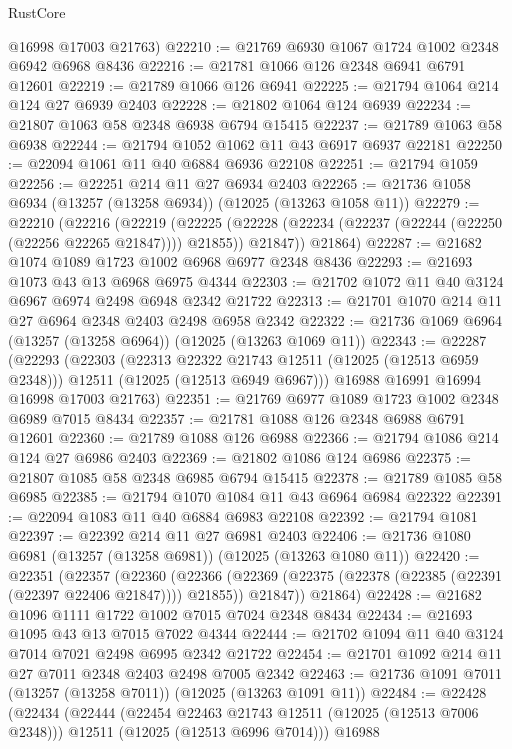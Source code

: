 \begin{lexlean}{RustCore}
\begin{coremodule}
      @16998
      @17003
      @21763)
@22210 := @21769 @6930 @1067 @1724 @1002 @2348 @6942 @6968 @8436
@22216 := @21781 @1066 @126 @2348 @6941 @6791 @12601
@22219 := @21789 @1066 @126 @6941
@22225 := @21794 @1064 @214 @124 @27 @6939 @2403
@22228 := @21802 @1064 @124 @6939
@22234 := @21807 @1063 @58 @2348 @6938 @6794 @15415
@22237 := @21789 @1063 @58 @6938
@22244 := @21794 @1052 @1062 @11 @43 @6917 @6937 @22181
@22250 := @22094 @1061 @11 @40 @6884 @6936 @22108
@22251 := @21794 @1059
@22256 := @22251 @214 @11 @27 @6934 @2403
@22265 := @21736 @1058 @6934 (@13257 (@13258 @6934)) (@12025 (@13263 @1058 @11))
@22279 := @22210
    (@22216
      (@22219
        (@22225 (@22228 (@22234 (@22237 (@22244 (@22250 (@22256 @22265 @21847)))) @21855)) @21847))
      @21864)
@22287 := @21682 @1074 @1089 @1723 @1002 @6968 @6977 @2348 @8436
@22293 := @21693 @1073 @43 @13 @6968 @6975 @4344
@22303 := @21702 @1072 @11 @40 @3124 @6967 @6974 @2498 @6948 @2342 @21722
@22313 := @21701 @1070 @214 @11 @27 @6964 @2348 @2403 @2498 @6958 @2342
@22322 := @21736 @1069 @6964 (@13257 (@13258 @6964)) (@12025 (@13263 @1069 @11))
@22343 := @22287
    (@22293
      (@22303
        (@22313 @22322 @21743 @12511 (@12025 (@12513 @6959 @2348)))
        @12511
        (@12025 (@12513 @6949 @6967)))
      @16988
      @16991
      @16994
      @16998
      @17003
      @21763)
@22351 := @21769 @6977 @1089 @1723 @1002 @2348 @6989 @7015 @8434
@22357 := @21781 @1088 @126 @2348 @6988 @6791 @12601
@22360 := @21789 @1088 @126 @6988
@22366 := @21794 @1086 @214 @124 @27 @6986 @2403
@22369 := @21802 @1086 @124 @6986
@22375 := @21807 @1085 @58 @2348 @6985 @6794 @15415
@22378 := @21789 @1085 @58 @6985
@22385 := @21794 @1070 @1084 @11 @43 @6964 @6984 @22322
@22391 := @22094 @1083 @11 @40 @6884 @6983 @22108
@22392 := @21794 @1081
@22397 := @22392 @214 @11 @27 @6981 @2403
@22406 := @21736 @1080 @6981 (@13257 (@13258 @6981)) (@12025 (@13263 @1080 @11))
@22420 := @22351
    (@22357
      (@22360
        (@22366 (@22369 (@22375 (@22378 (@22385 (@22391 (@22397 @22406 @21847)))) @21855)) @21847))
      @21864)
@22428 := @21682 @1096 @1111 @1722 @1002 @7015 @7024 @2348 @8434
@22434 := @21693 @1095 @43 @13 @7015 @7022 @4344
@22444 := @21702 @1094 @11 @40 @3124 @7014 @7021 @2498 @6995 @2342 @21722
@22454 := @21701 @1092 @214 @11 @27 @7011 @2348 @2403 @2498 @7005 @2342
@22463 := @21736 @1091 @7011 (@13257 (@13258 @7011)) (@12025 (@13263 @1091 @11))
@22484 := @22428
    (@22434
      (@22444
        (@22454 @22463 @21743 @12511 (@12025 (@12513 @7006 @2348)))
        @12511
        (@12025 (@12513 @6996 @7014)))
      @16988

\end{coremodule}
\end{lexlean}
